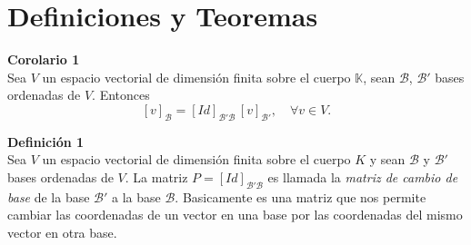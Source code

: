 \documentclass{article}
\newenvironment{definition}[2][Definición]
    { \begin{mdframed}[backgroundcolor=red!20] \textbf{#1 #2} \\}
    {  \end{mdframed}}
\newenvironment{corollary}[2][Corolario]
    { \begin{mdframed}[backgroundcolor=green!20] \textbf{#1 #2} \\}
    {  \end{mdframed}}
\begin{document}
\section*{Definiciones y Teoremas}
\begin{corollary}{1}  
Sea $V$ un espacio vectorial de dimensión finita sobre el cuerpo $\mathbb{K}$, sean $\mathcal{B}$, $\mathcal{B}'$  bases ordenadas de $V$. Entonces
\[
[v]_{\mathcal{B}} = [Id]_{\mathcal{B}' \mathcal{B}}\, [v]_{\mathcal{B}'}, \quad \forall v \in V.
\]
\end{corollary}
\begin{definition}{1}
Sea $V$ un espacio vectorial de dimensión finita sobre el cuerpo $K$ y sean $\mathcal{B}$ y $\mathcal{B}'$ bases ordenadas de $V$. La matriz $P =[Id]_{\mathcal{B}' \mathcal{B}}$  es llamada la \emph{matriz de cambio de base} de la base $\mathcal{B}'$  a la base $\mathcal{B}$. Basicamente es una matriz que nos permite cambiar las coordenadas de un vector en una base por las coordenadas del mismo vector en otra base.
\end{definition}

\end{document}
